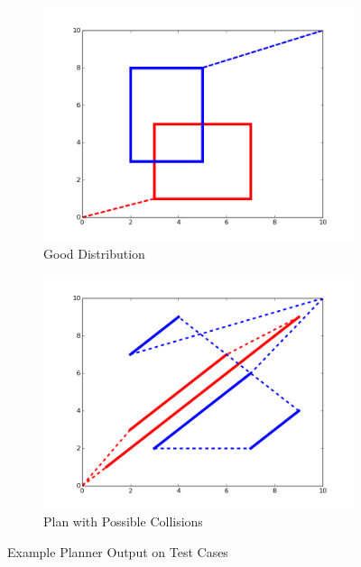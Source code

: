 \begin{figure}[h!]
\centering
\begin{subfigure}[b]{0.48\textwidth}
    \includegraphics[width=\textwidth]{figs/figure_7.png}
    \caption{Good Distribution}
    \label{fig:planner2}
\end{subfigure}
\begin{subfigure}[b]{0.48\textwidth}
    \includegraphics[width=\textwidth]{figs/figure_4.png}
    \caption{Plan with Possible Collisions}
    \label{fig:planner3}
\end{subfigure}        
\caption{Example Planner Output on Test Cases}
\label{fig:more_output}
\end{figure}
